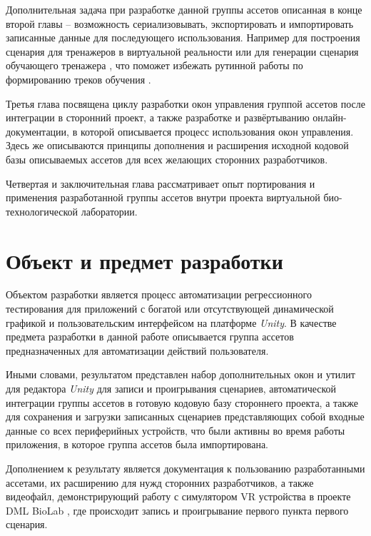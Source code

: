 Дополнительная задача при разработке данной группы ассетов описанная в конце второй главы -- возможность сериализовывать, экспортировать и импортировать записанные данные для последующего использования. Например для построения сценария для тренажеров в виртуальной реальности \cite{disser} или для генерации сценария обучающего тренажера \cite{vr-simulators}, что поможет избежать рутинной работы по формированию треков обучения \cite{visual-editor}.

Третья глава посвящена циклу разработки окон управления группой ассетов после интеграции в сторонний проект, а также разработке и развёртыванию онлайн-документации, в которой описывается процесс использования окон управления. Здесь же описываются принципы дополнения и расширения исходной кодовой базы описываемых ассетов для всех желающих сторонних разработчиков.

Четвертая и заключительная глава рассматривает опыт портирования и применения разработанной группы ассетов внутри проекта виртуальной био-технологической лаборатории.

\section*{Объект и предмет разработки}
Объектом разработки является процесс автоматизации регрессионного тестирования для приложений с богатой или отсутствующей динамической графикой и пользовательским интерфейсом на платформе \textit{Unity}. В качестве предмета разработки в данной работе описывается группа ассетов предназначенных для автоматизации действий пользователя.

Иными словами, результатом представлен набор дополнительных окон и утилит для редактора \textit{Unity} для записи и проигрывания сценариев, автоматической интеграции группы ассетов в готовую кодовую базу стороннего проекта, а также для сохранения и загрузки записанных сценариев представляющих собой входные данные со всех периферийных устройств, что были активны во время работы приложения, в которое группа ассетов была импортирована.

Дополнением к результату является документация к пользованию разработанными ассетами, их расширению для нужд сторонних разработчиков, а также видеофайл, демонстрирующий работу с симулятором VR устройства в проекте DML BioLab \cite{biolab}, где происходит запись и проигрывание первого пункта первого сценария.
